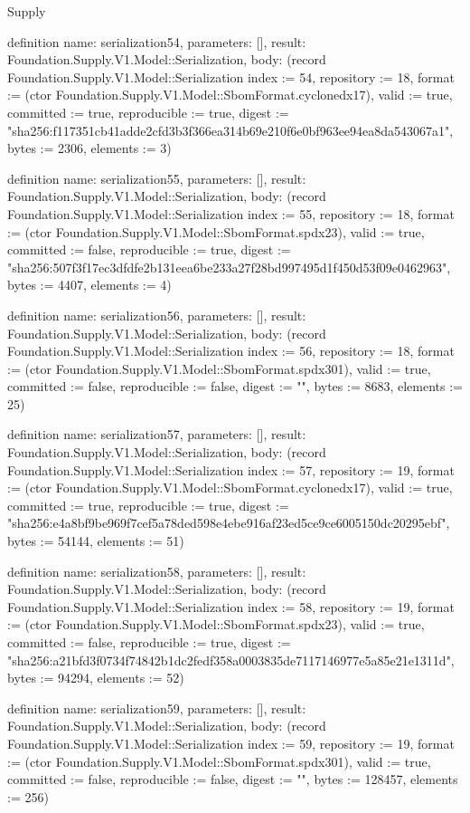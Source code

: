 \begin{lexlean}{Supply}
\begin{semanticmodule}
definition{
  name: serialization54,
  parameters: [],
  result: Foundation.Supply.V1.Model::Serialization,
  body: (record Foundation.Supply.V1.Model::Serialization {index := 54, repository := 18, format := (ctor Foundation.Supply.V1.Model::SbomFormat.cyclonedx17), valid := true, committed := true, reproducible := true, digest := "sha256:f117351cb41adde2cfd3b3f366ea314b69e210f6e0bf963ee94ea8da543067a1", bytes := 2306, elements := 3})
}

definition{
  name: serialization55,
  parameters: [],
  result: Foundation.Supply.V1.Model::Serialization,
  body: (record Foundation.Supply.V1.Model::Serialization {index := 55, repository := 18, format := (ctor Foundation.Supply.V1.Model::SbomFormat.spdx23), valid := true, committed := false, reproducible := true, digest := "sha256:507f3f17ec3dfdfe2b131eea6be233a27f28bd997495d1f450d53f09e0462963", bytes := 4407, elements := 4})
}

definition{
  name: serialization56,
  parameters: [],
  result: Foundation.Supply.V1.Model::Serialization,
  body: (record Foundation.Supply.V1.Model::Serialization {index := 56, repository := 18, format := (ctor Foundation.Supply.V1.Model::SbomFormat.spdx301), valid := true, committed := false, reproducible := false, digest := "", bytes := 8683, elements := 25})
}

definition{
  name: serialization57,
  parameters: [],
  result: Foundation.Supply.V1.Model::Serialization,
  body: (record Foundation.Supply.V1.Model::Serialization {index := 57, repository := 19, format := (ctor Foundation.Supply.V1.Model::SbomFormat.cyclonedx17), valid := true, committed := true, reproducible := true, digest := "sha256:e4a8bf9be969f7cef5a78ded598e4ebe916af23ed5ce9ce6005150dc20295ebf", bytes := 54144, elements := 51})
}

definition{
  name: serialization58,
  parameters: [],
  result: Foundation.Supply.V1.Model::Serialization,
  body: (record Foundation.Supply.V1.Model::Serialization {index := 58, repository := 19, format := (ctor Foundation.Supply.V1.Model::SbomFormat.spdx23), valid := true, committed := false, reproducible := true, digest := "sha256:a21bfd3f0734f74842b1dc2fedf358a0003835de7117146977e5a85e21e1311d", bytes := 94294, elements := 52})
}

definition{
  name: serialization59,
  parameters: [],
  result: Foundation.Supply.V1.Model::Serialization,
  body: (record Foundation.Supply.V1.Model::Serialization {index := 59, repository := 19, format := (ctor Foundation.Supply.V1.Model::SbomFormat.spdx301), valid := true, committed := false, reproducible := false, digest := "", bytes := 128457, elements := 256})
}


\end{semanticmodule}
\end{lexlean}
